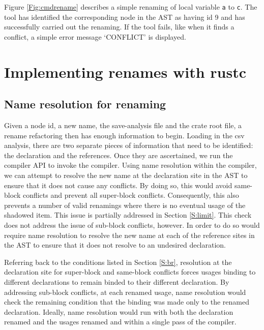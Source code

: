 Figure \ref{Fig:cmdrename} describes a simple renaming of local variable {\verb|a|} to {\verb|c|}. The tool has identified the corresponding node in the AST as having id 9 and has successfully carried out the renaming. If the tool fails, like when it finds a conflict, a simple error message `CONFLICT' is displayed.


\section{Implementing renames with rustc}\label{S:building}
\subsection{Name resolution for renaming}
Given a node id, a new name, the save-analysis file and the crate root file, a rename refactoring then has enough information to begin. Loading in the csv analysis, there are two separate pieces of information that need to be identified: the declaration and the references. Once they are ascertained, we run the compiler API to invoke the compiler. Using name resolution within the compiler, we can attempt to resolve the new name at the declaration site in the AST to ensure that it does not cause any conflicts. By doing so, this would avoid same-block conflicts and prevent all super-block conflicts. Consequently, this also prevents a number of valid renamings where there is no eventual usage of the shadowed item. This issue is partially addressed in Section \ref{S:limit}. This check does not address the issue of sub-block conflicts, however. In order to do so would require name resolution to resolve the new name at each of the reference sites in the AST to ensure that it does not resolve to an undesired declaration. 

Referring back to the conditions listed in Section \ref{S:br}, resolution at the declaration site for super-block and same-block conflicts forces usages binding to different declarations to remain binded to their different declaration. By addressing sub-block conflicts, at each renamed usage, name resolution would check the remaining condition that the binding was made only to the renamed declaration. Ideally, name resolution would run with both the declaration renamed and the usages renamed and within a single pass of the compiler.

